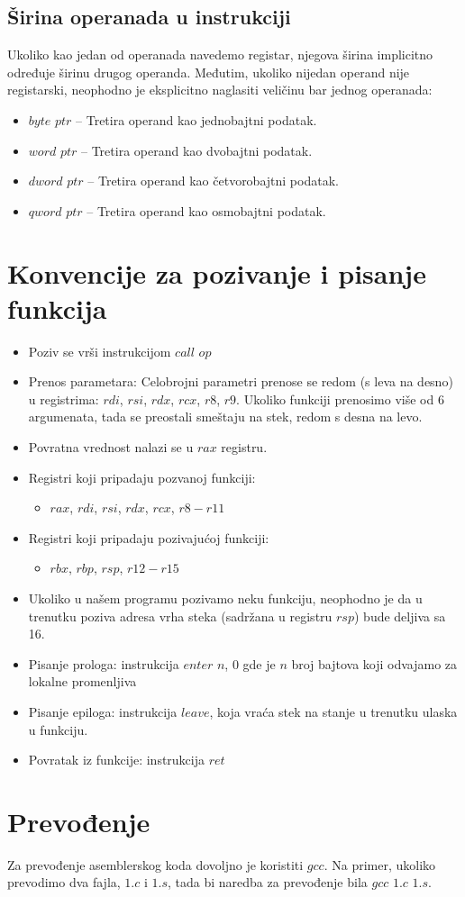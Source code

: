 \documentclass[a4paper, 10pt]{article}
\begin{document}
\subsection{Širina operanada u instrukciji}
Ukoliko kao jedan od operanada navedemo registar, njegova širina implicitno određuje širinu drugog operanda. Međutim, ukoliko nijedan operand nije registarski, neophodno je eksplicitno naglasiti veličinu bar jednog operanada:
	\begin{itemize}
		\item $byte$ $ptr$ -- Tretira operand kao jednobajtni podatak.
		\item $word$ $ptr$ -- Tretira operand kao dvobajtni podatak.
		\item $dword$ $ptr$ -- Tretira operand kao četvorobajtni podatak.
		\item $qword$ $ptr$ -- Tretira operand kao osmobajtni podatak.
	\end{itemize}
\section{Konvencije za pozivanje i pisanje funkcija}
\begin{itemize}
\item Poziv se vrši instrukcijom $call$ $op$
	\item Prenos parametara: Celobrojni parametri prenose se redom (s leva na desno) u registrima: $rdi$, $rsi$, $rdx$, $rcx$, $r8$, $r9$. Ukoliko funkciji prenosimo više od 6 argumenata, tada se preostali smeštaju na stek, redom s desna na levo.
	\item Povratna vrednost nalazi se u $rax$ registru.
	\item Registri koji pripadaju pozvanoj funkciji:
		\begin{itemize}
			\item $rax$, $rdi$, $rsi$, $rdx$, $rcx$, $r8-r11$
		\end{itemize}
	\item Registri koji pripadaju pozivajućoj funkciji:
		\begin{itemize}
			\item $rbx$, $rbp$, $rsp$, $r12-r15$
		\end{itemize}
	\item Ukoliko u našem programu pozivamo neku funkciju, neophodno je da u trenutku poziva adresa vrha steka (sadržana u registru $rsp$) bude deljiva sa 16.
	\item Pisanje prologa: instrukcija $enter$ $n$, $0$ gde je $n$ broj bajtova koji odvajamo za lokalne promenljiva
	\item Pisanje epiloga: instrukcija $leave$, koja vraća stek na stanje u trenutku ulaska u funkciju.
	\item Povratak iz funkcije: instrukcija $ret$
\end{itemize}
	
\section{Prevođenje}
Za prevođenje asemblerskog koda dovoljno je koristiti $gcc$. Na primer, ukoliko prevodimo dva fajla, $1.c$ i $1.s$, tada bi naredba za prevođenje bila $gcc$ $1.c$ $1.s$.
\end{document}
